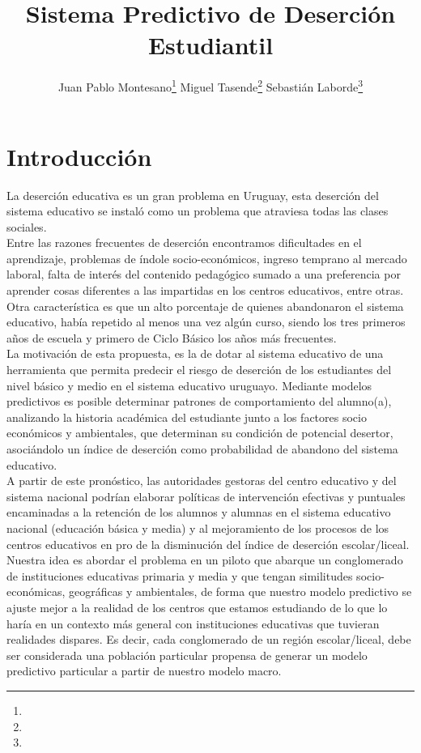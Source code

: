 \documentclass[12pt]{article}
\title{Sistema Predictivo de Deserción Estudiantil}
\author{Juan Pablo Montesano\thanks{\email{jmontesano@antel.com.uy}}  
\quad Miguel Tasende\thanks{\email{mtasendebracco@antel.com.uy}} 
\quad Sebastián Laborde\thanks{\email{nlaborde@antel.com.uy}}}
\affil{Antel}
\begin{document}
\maketitle

\section{Introducción}
La deserción educativa es un gran problema en Uruguay, esta deserción del sistema educativo se instaló como un problema que atraviesa todas las clases sociales.\\
Entre las razones frecuentes de deserción encontramos dificultades en el aprendizaje, problemas de índole socio-económicos, ingreso temprano al mercado laboral, falta de interés del contenido pedagógico sumado a una preferencia por aprender cosas diferentes a las impartidas en los centros educativos, entre otras. Otra característica es que un alto porcentaje de quienes abandonaron el sistema educativo, había repetido al menos una vez algún curso, siendo los tres primeros años de escuela y primero de Ciclo Básico los años más frecuentes.\\
La motivación de esta propuesta, es la de dotar al sistema educativo de una herramienta que permita predecir el riesgo de deserción de los estudiantes del nivel básico y medio en el sistema educativo uruguayo. Mediante modelos predictivos es posible determinar patrones de comportamiento del alumno(a), analizando la historia académica del estudiante junto a los factores socio económicos y ambientales, que determinan su condición de potencial desertor, asociándolo un índice de deserción como probabilidad de abandono del sistema educativo.\\
A partir de este pronóstico, las autoridades gestoras del centro educativo y del sistema nacional podrían elaborar políticas de intervención efectivas y puntuales encaminadas a la retención de los alumnos y alumnas en el sistema educativo nacional (educación básica
y media) y al mejoramiento de los procesos de los centros educativos en pro de la disminución del índice de deserción escolar/liceal.\\
Nuestra idea es abordar el problema en un piloto que abarque un conglomerado de instituciones educativas primaria y media y que tengan similitudes socio-económicas, geográficas y ambientales, de forma que nuestro modelo predictivo se ajuste mejor a la realidad de los centros que estamos estudiando de lo que lo haría en un contexto más general con instituciones educativas que tuvieran realidades dispares. Es decir, cada conglomerado de un región escolar/liceal, debe ser considerada una población particular propensa de generar un modelo predictivo particular a partir de nuestro modelo macro.
\end{document}
